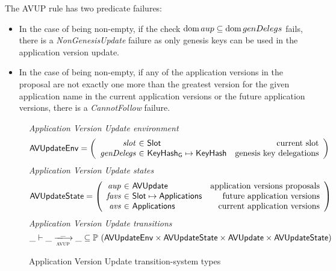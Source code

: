 The AVUP rule has two predicate failures:
\begin{itemize}
\item In the case of  being non-empty, if the check $\operatorname{dom} aup \subseteq
  \operatorname{dom} genDelegs$ fails, there is a \emph{NonGenesisUpdate} failure as only genesis keys
  can be used in the application version update.
\item In the case of  being non-empty, if any of the application versions
  in the proposal are not exactly one more than the greatest version for the given
  application name in the current application versions or the future application
  versions, there is a \emph{CannotFollow} failure.
\end{itemize}

\begin{figure}[htb]
  \emph{Application Version Update environment}
  \begin{equation*}
    \AVUpdateEnv =
    \left(
      \begin{array}{r@{~\in~}lr}
        \var{slot} & \Slot & \text{current slot}\\
        \var{genDelegs} & \KeyHashGen\mapsto\KeyHash & \text{genesis key delegations} \\
      \end{array}
    \right)
  \end{equation*}
  \emph{Application Version Update states}
  \begin{equation*}
    \AVUpdateState =
    \left(
      \begin{array}{r@{~\in~}lr}
        \var{aup} & \AVUpdate & \text{application versions proposals} \\
        \var{favs} & \Slot\mapsto\Applications & \text{future application versions} \\
        \var{avs} & \Applications & \text{current application versions} \\
      \end{array}
    \right)
  \end{equation*}
  \emph{Application Version Update transitions}
  \begin{equation*}
    \_ \vdash
    \var{\_} \trans{avup}{\_} \var{\_}
    \subseteq \powerset (\AVUpdateEnv \times \AVUpdateState \times \AVUpdate \times \AVUpdateState)
  \end{equation*}
  \caption{Application Version Update transition-system types}
  \label{fig:ts-types:av-update}
\end{figure}


